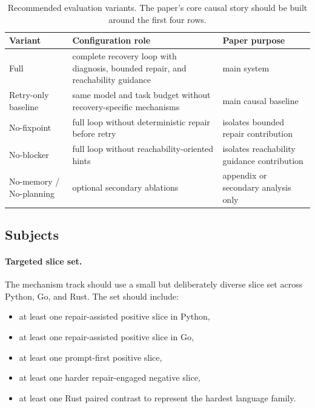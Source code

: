 \documentclass[10pt]{article}
\begin{document}
\begin{table}[t]
\centering
\small
\begin{tabularx}{\textwidth}{>{\raggedright\arraybackslash}p{} >{\raggedright\arraybackslash}p{} >{\raggedright\arraybackslash}X}
\toprule
Variant & Configuration role & Paper purpose \\
\midrule
Full & complete recovery loop with diagnosis, bounded repair, and reachability guidance & main system \\
Retry-only baseline & same model and task budget without recovery-specific mechanisms & main causal baseline \\
No-fixpoint & full loop without deterministic repair before retry & isolates bounded repair contribution \\
No-blocker & full loop without reachability-oriented hints & isolates reachability guidance contribution \\
No-memory / No-planning & optional secondary ablations & appendix or secondary analysis only \\
\bottomrule
\end{tabularx}
\caption{Recommended evaluation variants. The paper's core causal story should be built around the first four rows.}
\label{tab:eval-variants}
\end{table}

\subsection{Subjects}

\paragraph{Targeted slice set.}
The mechanism track should use a small but deliberately diverse slice set across Python, Go, and Rust. The set should include:
\begin{itemize}[leftmargin=1.4em]
    \item at least one repair-assisted positive slice in Python,
    \item at least one repair-assisted positive slice in Go,
    \item at least one prompt-first positive slice,
    \item at least one harder repair-engaged negative slice,
    \item at least one Rust paired contrast to represent the hardest language family.
\end{itemize}
\end{document}
